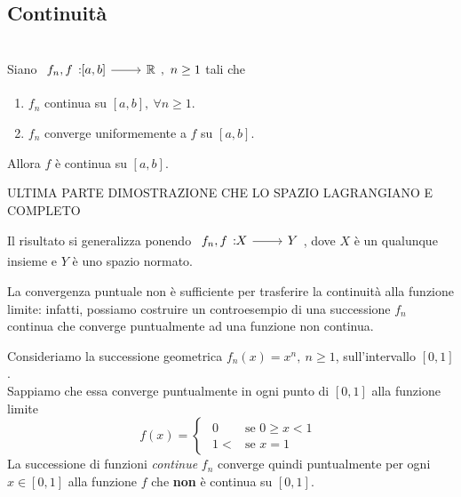 \subsection{Continuità}
\begin{theorema}~{}\\
	Siano $\funz{f_n,f}{\left[a,b\right]}{\realset},\ n\geq 1$ tali che
	\begin{enumerate}
		\item $f_n$ continua su $\left[a,b\right],\ \forall n\geq 1$.
		\item $f_n$ converge uniformemente a $f$ su $\left[a,b\right]$.
	\end{enumerate}
	Allora $f$ è continua su $\left[a,b\right]$.
\end{theorema}
\begin{demonstration}
	ULTIMA PARTE DIMOSTRAZIONE CHE LO SPAZIO LAGRANGIANO E COMPLETO %
\end{demonstration}
\begin{digression}
	Il risultato si generalizza ponendo $\funz{f_n,f}{X}{Y}$, dove $X$ è un qualunque insieme e $Y$ è uno spazio normato.
\end{digression}
La convergenza puntuale non è sufficiente per trasferire la continuità alla funzione limite: infatti, possiamo costruire un controesempio di una successione $f_n$ continua che converge puntualmente ad una funzione non continua.
\begin{example}
Consideriamo la successione geometrica $f_n(x)=x^n,\ n\geq1$, sull'intervallo $[0,1]$.\\
Sappiamo che essa converge puntualmente in ogni punto di $[0,1]$ alla funzione limite 
\begin{equation*}
	f\left(x\right)=
	\begin{cases}
		\begin{array}{ll}
			0&\text{se }0\geq x < 1\\
			1<&\text{se }x=1
		\end{array}
	\end{cases}
\end{equation*}
La successione di funzioni \textit{continue} $f_n$ converge quindi puntualmente per ogni $x\in[0,1]$ alla funzione $f$ che \textbf{non} è continua su $[0,1]$.
\end{example}
